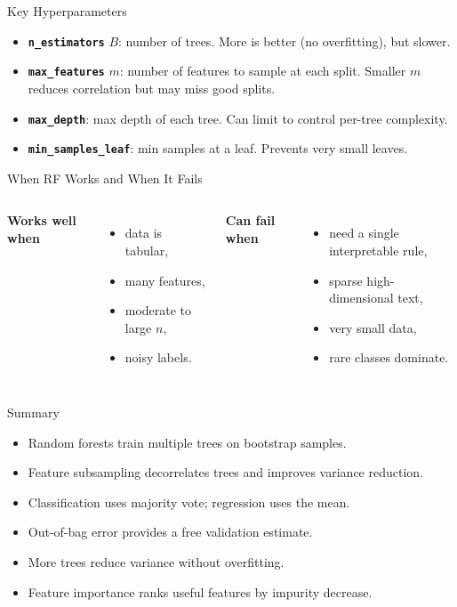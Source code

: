 \begin{frame}{Key Hyperparameters}
\begin{itemize}
  \item \textbf{\texttt{n\_estimators}} $B$: number of trees. More is better (no overfitting), but slower.
  \pause
  \item \textbf{\texttt{max\_features}} $m$: number of features to sample at each split. Smaller $m$ reduces correlation but may miss good splits.
  \pause
  \item \textbf{\texttt{max\_depth}}: max depth of each tree. Can limit to control per-tree complexity.
  \pause
  \item \textbf{\texttt{min\_samples\_leaf}}: min samples at a leaf. Prevents very small leaves.
\end{itemize}
\end{frame}

\begin{frame}{When RF Works and When It Fails}
\begin{columns}[T]
\textbf{Works well when}
\begin{itemize}
  \item data is tabular,
  \pause
  \item many features,
  \pause
  \item moderate to large $n$,
  \pause
  \item noisy labels.
\end{itemize}

\pause
{}
\textbf{Can fail when}
\begin{itemize}
  \item need a single interpretable rule,
  \pause
  \item sparse high-dimensional text,
  \pause
  \item very small data,
  \pause
  \item rare classes dominate.
\end{itemize}
\end{columns}
\end{frame}

\begin{frame}{Summary}
\begin{itemize}
  \item Random forests train multiple trees on bootstrap samples.
  \item Feature subsampling decorrelates trees and improves variance reduction.
  \item Classification uses majority vote; regression uses the mean.
  \item Out-of-bag error provides a free validation estimate.
  \item More trees reduce variance without overfitting.
  \item Feature importance ranks useful features by impurity decrease.
\end{itemize}
\end{frame}

